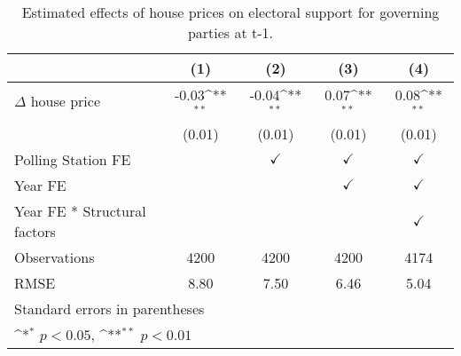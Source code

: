 \begin{table}[htbp]\centering
\def\sym#1{\ifmmode^{#1}\else\(^{#1}\)\fi}
\caption{Estimated effects of house prices on electoral support for governing parties at t-1.}
\begin{tabular}{l*{4}{c}}
\hline\hline
                    &\multicolumn{1}{c}{(1)}        &\multicolumn{1}{c}{(2)}        &\multicolumn{1}{c}{(3)}        &\multicolumn{1}{c}{(4)}        \\
\hline
$\Delta$ house price&       -0.03\sym{**}&       -0.04\sym{**}&        0.07\sym{**}&        0.08\sym{**}\\
                    &      (0.01)        &      (0.01)        &      (0.01)        &      (0.01)        \\
[1em]
\hline Polling Station FE&                    &$\checkmark$        &$\checkmark$        &$\checkmark$        \\
[1em]
Year FE             &                    &                    &$\checkmark$        &$\checkmark$        \\
[1em]
Year FE * Structural factors&                    &                    &                    &$\checkmark$        \\
\hline
Observations        &        4200        &        4200        &        4200        &        4174        \\
RMSE                &        8.80        &        7.50        &        6.46        &        5.04        \\
\hline\hline
\multicolumn{5}{l}{\footnotesize Standard errors in parentheses}\\
\multicolumn{5}{l}{\footnotesize \sym{*} \(p<0.05\), \sym{**} \(p<0.01\)}\\
\end{tabular}
\end{table}

